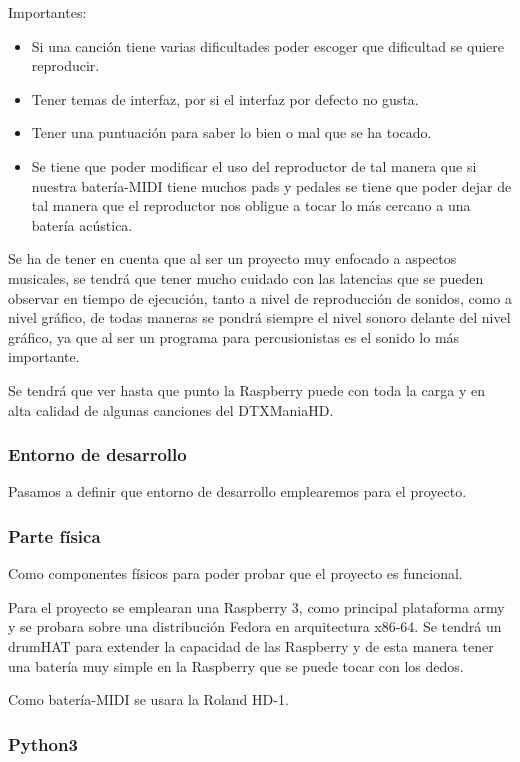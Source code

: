 \documentclass[a4paper,11pt,oneside]{book}
\begin{document}
Importantes:
\begin{itemize}
  \item Si una canción tiene varias dificultades poder escoger que dificultad se quiere reproducir.
  \item Tener temas de interfaz, por si el interfaz por defecto no gusta.
  \item Tener una puntuación para saber lo bien o mal que se ha tocado.
  \item Se tiene que poder modificar el uso del reproductor de tal manera que si nuestra batería-MIDI tiene muchos pads y pedales se tiene que poder dejar de tal manera que el reproductor nos obligue a tocar lo más cercano a una batería acústica.
\end{itemize}

Se ha de tener en cuenta que al ser un proyecto muy enfocado a aspectos musicales, se tendrá que tener mucho cuidado con las latencias que se pueden observar en tiempo de ejecución, tanto a nivel de reproducción de sonidos, como a nivel gráfico, de todas maneras se pondrá siempre el nivel sonoro delante del nivel gráfico, ya que al ser un programa para percusionistas es el sonido lo más importante.

Se tendrá que ver hasta que punto la Raspberry puede con toda la carga y en alta calidad de algunas canciones del DTXManiaHD.

\subsubsection{Entorno de desarrollo}
Pasamos a definir que entorno de desarrollo emplearemos para el proyecto.

\subsubsection{Parte física}

Como componentes físicos para poder probar que el proyecto es funcional.
 
Para el proyecto se emplearan una Raspberry 3, como principal plataforma army y se probara sobre una distribución Fedora en arquitectura x86-64.
Se tendrá un drumHAT para extender la capacidad de las Raspberry y de esta manera tener una batería muy simple en la Raspberry que se puede tocar con los dedos.

Como batería-MIDI se usara la Roland HD-1.

\subsubsection{Python3}
\end{document}
